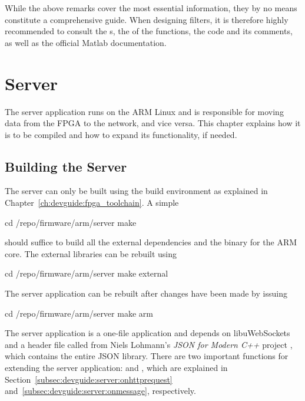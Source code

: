 While the above remarks cover the most essential information, they by no means
constitute  a comprehensive  guide. When  designing filters,  it is  therefore
highly  recommended to  consult  the s,  the   of  the
functions,  the  code  and  its  comments, as  well  as  the  official  Matlab
documentation.

%
%
\chapter{Server} %
\label{ch:devguide:server}

The server application runs on the ARM  Linux and is responsible for moving
data from the FPGA to the network, and vice versa. This chapter explains how
it is to be compiled and how to expand its functionality, if needed.

\section{Building the Server} %
\label{sec:devguide:server:build}

The  server can  only be  built using  the build  environment as  explained in
Chapter~\ref{ch:devguide:fpga_toolchain}.  A simple
\begin{commandshell}
    cd /repo/firmware/arm/server
    make
\end{commandshell}
\noindent should suffice to build all the external dependencies and the binary
for the ARM core. The external libraries can be rebuilt using
\begin{commandshell}
    cd /repo/firmware/arm/server
    make external
\end{commandshell}
\noindent The server  application can be rebuilt after changes  have been made
by issuing
\begin{commandshell}
    cd /repo/firmware/arm/server
    make arm
\end{commandshell}

The   server  application   is   a  one-file   application   and  depends   on
libuWebSockets~\cite{uws:github} and a header file called  from
Niels Lohmann's \emph{JSON for Modern C++} project \cite{lohmann:github:json},
which contains the entire JSON library.  There are two important functions for
extending the  server application:   and ,
which  are   explained  in  Section~\ref{subsec:devguide:server:onhttprequest}
and~\ref{subsec:devguide:server:onmessage}, respectively.

